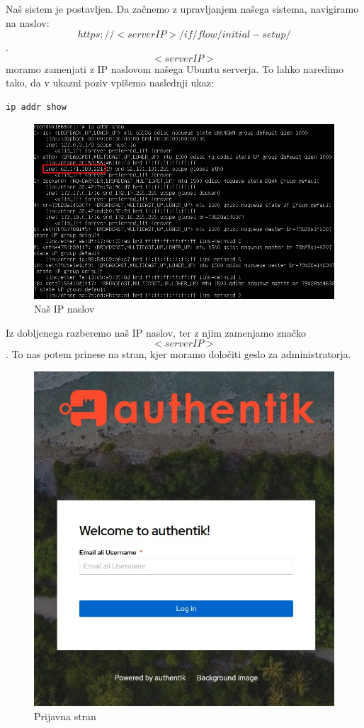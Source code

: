 \documentclass[a4paper,12pt,openright]{book}
\begin{document}
{Naš sistem je postavljen. Da začnemo z upravljanjem našega sistema, navigiramo na naslov: $$https://<serverIP>/if/flow/initial-setup/$$. $$<serverIP>$$ moramo zamenjati z IP naslovom našega Ubuntu serverja. To lahko naredimo tako, da v ukazni poziv vpišemo naslednji ukaz:
\begin{lstlisting}[language=bash]
ip addr show
\end{lstlisting}

\begin{figure}[H]
\includegraphics[scale=0.75]{diploma-FRI-vzorec_11maj2021/IP naslov.jpg}
\caption{Naš IP naslov}
\label{fig:student}
\end{figure}

Iz dobljenega razberemo naš IP naslov, ter z njim zamenjamo značko $$<serverIP>$$. To nas potem prinese na stran, kjer moramo določiti geslo za administratorja. 

\begin{figure}[H]
\includegraphics[scale=0.75]{diploma-FRI-vzorec_11maj2021/Uvodna stran.jpg}
\caption{Prijavna stran}
\label{fig}
\end{figure}


}
\end{document}
